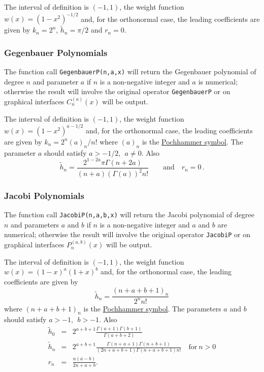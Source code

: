 The interval of definition is $(-1, 1)$, the weight function
$w(x)=(1-x^2)^{-1/2}$ and, for the orthonormal case, the leading
coefficients are given by $k_n= 2^n$, $\tilde{h}_n = \pi/2$ and $r_n=0$.

\subsubsection{Gegenbauer Polynomials}
\hypertarget{GEGENBAUERP}{}
 
The function call \texttt{GegenbauerP(n,a,x)} will return the Gegenbauer
polynomial of degree $n$ and parameter $a$ if $n$ is a non-negative integer
and $a$ is numerical; otherwise the result will involve the original operator
\texttt{GegenbauerP} or on graphical interfaces $C_n^{(a)}(x)$ will be output.

The interval of definition is $(-1, 1)$, the weight function
$w(x)=(1-x^2)^{a-1/2}$ and, for the orthonormal case, the leading
coefficients are given by $k_n= 2^n (a)_n/n!$ where $(a)_n$ is the
\hyperlink{POCH}{Pochhammer symbol}.
The parameter $a$ should satisfy $a >-1/2,\ \ a \neq 0$. Also
$$\tilde{h}_n = \frac{2^{1-2 a}\pi \Gamma(n+2a)}{(n+a)(\Gamma(a))^2n!}\qquad
\mbox{and}\quad r_n=0\,.$$

\subsubsection{Jacobi Polynomials}
\hypertarget{JACOBIP}{}
 
The function call \texttt{JacobiP(n,a,b,x)} will return the Jacobi
polynomial of degree $n$ and parameters $a$ and $b$ if $n$ is a non-negative
integer  and $a$ and $b$ are numerical; otherwise the result will involve
the original operator \texttt{JacobiP} or on graphical interfaces
$P_n^{(a, b)}(x)$ will be output.

The interval of definition is $(-1, 1)$, the weight function
$w(x)=(1-x)^a(1+x)^b$ and, for the orthonormal case, the leading
coefficients are given by
$$\tilde{h}_n = \frac{(n+a+b+1)_n}{2^nn!}$$
where $(n+a+b+1)_n$ is the \hyperlink{POCH}{Pochhammer symbol}.
The parameters $a$ and $b$ should satisfy $a >-1,\ \ b > -1$. Also
\begin{eqnarray*}
\tilde{h}_0 & = & 2^{a+b+1}\frac{\Gamma(a+1)\Gamma(b+1)}{\Gamma(a+b+2)}\\
\tilde{h}_n & = & 2^{a+b+1}\frac{\Gamma(n+a+1)\Gamma(n+b+1)}{(2 n +a+b+1)
\Gamma(n+a+b+1)n!}\quad \mbox{for}\ n>0\\
r_n & = & \frac{n(a-b)}{2n+a+b}.
\end{eqnarray*}

